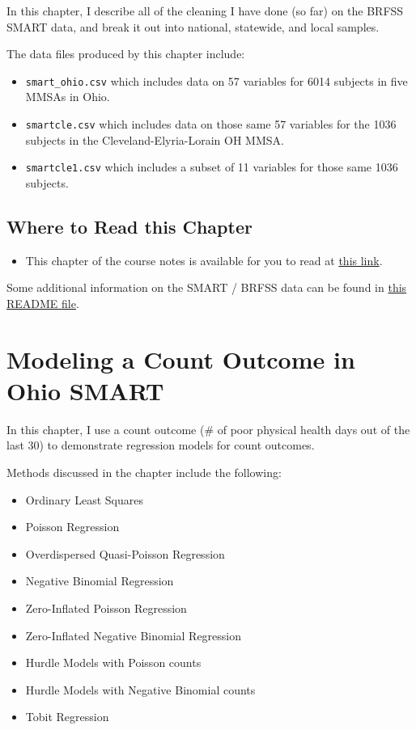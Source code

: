 \documentclass[]{book}
\providecommand{\tightlist}{%
  \setlength{\itemsep}{0pt}\setlength{\parskip}{0pt}}
\theoremstyle{definition}
\theoremstyle{definition}
\theoremstyle{definition}
\theoremstyle{remark}
\begin{document}
In this chapter, I describe all of the cleaning I have done (so far) on
the BRFSS SMART data, and break it out into national, statewide, and
local samples.

The data files produced by this chapter include:

\begin{itemize}
\tightlist
\item
  \texttt{smart\_ohio.csv} which includes data on 57 variables for 6014
  subjects in five MMSAs in Ohio.
\item
  \texttt{smartcle.csv} which includes data on those same 57 variables
  for the 1036 subjects in the Cleveland-Elyria-Lorain OH MMSA.
\item
  \texttt{smartcle1.csv} which includes a subset of 11 variables for
  those same 1036 subjects.
\end{itemize}

\section{Where to Read this Chapter}\label{where-to-read-this-chapter}

\begin{itemize}
\tightlist
\item
  This chapter of the course notes is available for you to read at
  \href{http://htmlpreview.github.io/?https://github.com/THOMASELOVE/432-2018/blob/master/data-and-code/SMART/smart.html}{this
  link}.
\end{itemize}

Some additional information on the SMART / BRFSS data can be found in
\href{https://github.com/THOMASELOVE/432-2018/tree/master/data-and-code/SMART}{this
README file}.

\chapter{Modeling a Count Outcome in Ohio
SMART}\label{modeling-a-count-outcome-in-ohio-smart}

In this chapter, I use a count outcome (\# of poor physical health days
out of the last 30) to demonstrate regression models for count outcomes.

Methods discussed in the chapter include the following:

\begin{itemize}
\tightlist
\item
  Ordinary Least Squares
\item
  Poisson Regression
\item
  Overdispersed Quasi-Poisson Regression
\item
  Negative Binomial Regression
\item
  Zero-Inflated Poisson Regression
\item
  Zero-Inflated Negative Binomial Regression
\item
  Hurdle Models with Poisson counts
\item
  Hurdle Models with Negative Binomial counts
\item
  Tobit Regression
\end{itemize}
\end{document}
